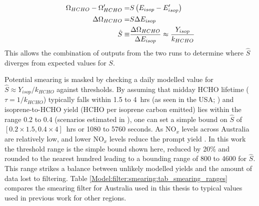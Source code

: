 {\begin{eqnarray}
      \Omega_{HCHO} - \Omega_{HCHO}' = & S \left( E_{isop} - E_{isop}' \right) \notag \\
      \Delta \Omega_{HCHO} = & S \Delta E_{isop}  \notag \\
      \hat{S} \equiv & \frac{\Delta{\Omega_{HCHO}}}{\Delta E_{isop}} \approx \frac{Y_{isop}}{k_{HCHO}} \label{Model:filter:smearing:calculation:eqn_hats}
      \end{eqnarray}
      This allows the combination of outputs from the two runs to determine where $\hat{S}$ diverges from expected values for $S$.
      
      Potential smearing is masked by checking a daily modelled value for $\hat{S} \approx Y_{isop}/k_{HCHO}$ against thresholds.
      By assuming that midday HCHO lifetime ($\tau = 1/k_{HCHO}$) typically falls within 1.5 to 4~hrs (as seen in the USA; \textcite[e.g.,][]{Palmer2006,Wolfe2016}) and isoprene-to-HCHO yield (HCHO per isoprene carbon emitted) lies within the range 0.2 to 0.4 (scenarios estimated in \textcite{Palmer2003}), one can set a simple bound on $\hat{S}$ of $[0.2 \times 1.5, 0.4 \times 4]$~hrs or 1080 to 5760 seconds.
      As NO$_x$ levels across Australia are relatively low, and lower NO$_x$ levels reduce the prompt yield \parencite{Palmer2003,Wolfe2016}.
      In this work the threshold range is the simple bound shown here, reduced by 20\% and rounded to the nearest hundred leading to a bounding range of 800 to 4600 for $\hat{S}$. 
      This range strikes a balance between unlikely modelled yields and the amount of data lost to filtering.
      Table \ref{Model:filter:smearing:tab_smearing_ranges} compares the smearing filter for Australia used in this thesis to typical values used in previous work for other regions.
      
}
